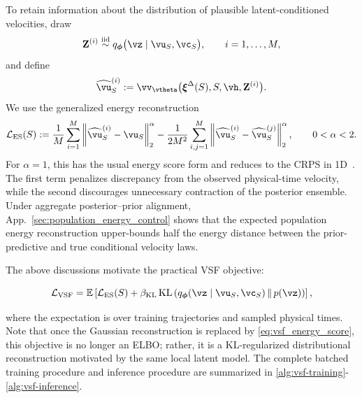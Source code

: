 To retain information about the distribution of plausible latent-conditioned
velocities, draw
\begin{equation}
\mathbf{Z}^{(i)}
\stackrel{\mathrm{iid}}{\sim}
q_{\boldsymbol{\phi}}
\bigl(
\vz
\mid
\vu_S,
\vc_S
\bigr),
\qquad
i=1,\ldots,M,
\label{eq:posterior_latent_samples}
\end{equation}
and define
\begin{equation}
\widehat{\vu}_S^{(i)}
:=
\vv_{\vtheta}
\bigl(
\boldsymbol{\xi}^{\Delta}(S),
S,
\vh,
\mathbf{Z}^{(i)}
\bigr).
\label{eq:posterior_velocity_samples}
\end{equation}
We use the generalized energy reconstruction
\begin{equation}
\mathcal L_{\mathrm{ES}}(S)
:=
\frac{1}{M}
\sum_{i=1}^M
\left\lVert
\widehat{\vu}_S^{(i)}
-
\vu_S
\right\rVert_2^\alpha
-
\frac{1}{2M^2}
\sum_{i,j=1}^M
\left\lVert
\widehat{\vu}_S^{(i)}
-
\widehat{\vu}_S^{(j)}
\right\rVert_2^\alpha,
\qquad
0<\alpha<2.
\label{eq:vsf_energy_score}
\end{equation}
For $\alpha=1$, this has the usual energy score form and reduces to the
CRPS in 1D~\citep{gneiting2007strictly}.
The first term penalizes discrepancy from the observed physical-time velocity,
while the second discourages unnecessary contraction of the  posterior
ensemble. Under aggregate posterior--prior alignment,
App.~\ref{sec:population_energy_control} shows that the expected
population energy reconstruction upper-bounds half the energy distance
between the prior-predictive and true conditional velocity laws.


The above discussions motivate the practical VSF objective:
\begin{tcolorbox}[
  colback=parchment,
  colframe=sandborder,
  boxrule=0.3pt,
  left=8pt,
  right=8pt,
  top=3pt,
  bottom=3pt
]
\begin{equation}
\mathcal L_{\mathrm{VSF}}
=
\mathbb E
\left[
\mathcal L_{\mathrm{ES}}(S)
+
\beta_{\mathrm{KL}}
\operatorname{KL}
\left(
q_{\boldsymbol{\phi}}
(\vz\mid\vu_S,\vc_S)
\,\Vert\,
p(\vz)
\right)
\right],
\label{eq:vsf_training_objective}
\end{equation}
\end{tcolorbox}
where the expectation is over training trajectories and sampled physical times. Note that once the Gaussian reconstruction is replaced by
\eqref{eq:vsf_energy_score}, this objective is no longer an ELBO; rather, it
is a KL-regularized distributional reconstruction motivated by the same local
latent model.
The complete batched training procedure and inference procedure are summarized in
\cref{alg:vsf-training}-\cref{alg:vsf-inference}.
%




